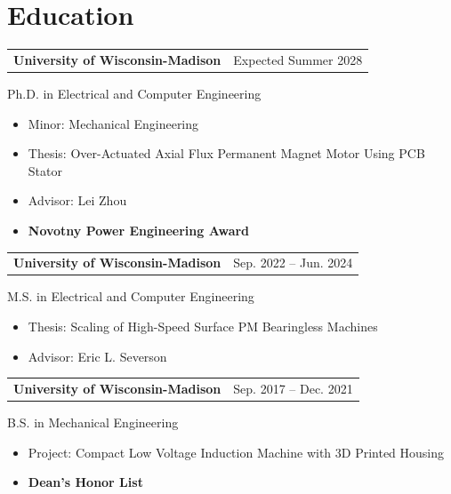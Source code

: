 \section{\sc Education}

\begin{tabular}{@{}p{4in}>{\raggedleft\arraybackslash}p{1.5in}}
    {\bf University of Wisconsin-Madison} & Expected Summer 2028 \\
\end{tabular}
Ph.D. in Electrical and Computer Engineering
\begin{itemize}
    \item Minor: Mechanical Engineering
    \item Thesis: Over-Actuated Axial Flux Permanent Magnet Motor Using PCB Stator
    \item Advisor: Lei Zhou
    \item {\color{maroon} \textbf{Novotny Power Engineering Award}}
\end{itemize}

\begin{tabular}{@{}p{4in}>{\raggedleft\arraybackslash}p{1.5in}}
    {\bf University of Wisconsin-Madison} & Sep. 2022 -- Jun. 2024 \\
\end{tabular}
M.S. in Electrical and Computer Engineering
\begin{itemize}
    \item Thesis: Scaling of High-Speed Surface PM Bearingless Machines
    \item Advisor: Eric L. Severson
\end{itemize}

\begin{tabular}{@{}p{4in}>{\raggedleft\arraybackslash}p{1.5in}}
    {\bf University of Wisconsin-Madison} & Sep. 2017 -- Dec. 2021 \\
\end{tabular}
B.S. in Mechanical Engineering
\begin{itemize}
    \item Project: Compact Low Voltage Induction Machine with 3D Printed Housing
    \item {\color{maroon} \textbf{Dean's Honor List}}
\end{itemize}
\endinput